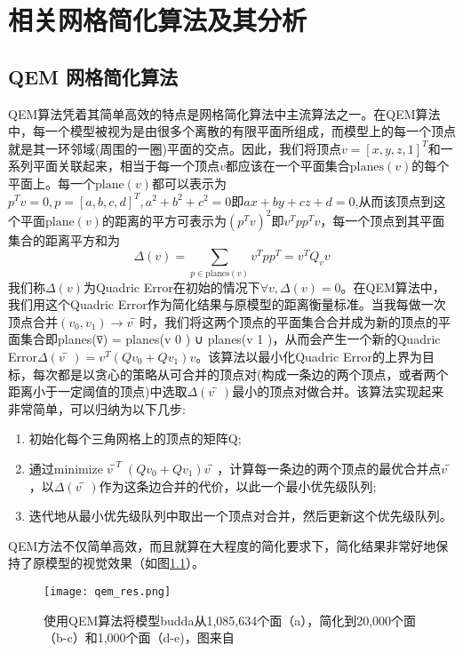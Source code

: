 
\chapter{相关网格简化算法及其分析}
\section{QEM 网格简化算法}
QEM算法凭着其简单高效的特点是网格简化算法中主流算法之一。在QEM算法中，每一个模型被视为是由很多个离散的有限平面所组成，而模型上的每一个顶点就是其一环邻域(周围的一圈)平面的交点。因此，我们将顶点$v=[x,y,z,1]^T$和一系列平面关联起来，相当于每一个顶点$v$都应该在一个平面集合$\text{planes}(v)$的每个平面上。每一个$\text{plane}(v)$都可以表示为$p^Tv=0,p=[a,b,c,d]^T,a^2+b^2+c^2=0即ax+by+cz+d=0$,从而该顶点到这个平面$\text{plane}(v)$的距离的平方可表示为$(p^Tv)^2$即$v^Tpp^Tv$，每一个顶点到其平面集合的距离平方和为
\begin{equation}
  \Delta(v) = \sum_{p\in \text{planes}(v)}v^Tpp^T = v^TQ_vv
\end{equation}
我们称$\Delta(v)$为Quadric Error在初始的情况下$\forall v,\Delta(v)=0$。在QEM算法中，我们用这个Quadric
Error作为简化结果与原模型的距离衡量标准。当我每做一次顶点合并$(v_0, v_1) \to v̅$时，我们将这两个顶点的平面集合合并成为新的顶点的平面集合即planes(v̅) = planes(v 0 ) ∪ planes(v 1 )，从而会产生一个新的Quadric Error$\Delta(v̅)=v^T(Qv_0+Qv_1)v$。该算法以最小化Quadric Error的上界为目标，每次都是以贪心的策略从可合并的顶点对(构成一条边的两个顶点，或者两个距离小于一定阈值的顶点)中选取$\Delta(v̅)$最小的顶点对做合并。该算法实现起来非常简单，可以归纳为以下几步:
\begin{enumerate}
  \item 初始化每个三角网格上的顶点的矩阵Q;
  \item 通过$\text{minimize} \; v̅^T(Qv_0+Qv_1)v̅$，计算每一条边的两个顶点的最优合并点$v̅$ ，以$\Delta(v̅)$作为这条边合并的代价，以此一个最小优先级队列;
  \item 迭代地从最小优先级队列中取出一个顶点对合并，然后更新这个优先级队列。
\end{enumerate}
QEM方法不仅简单高效，而且就算在大程度的简化要求下，简化结果非常好地保持了原模型的视觉效果（如图\ref{fig:qem-res}）。
\begin{figure}[htbp]
    \centering
    \texttt{[image: qem\_res.png]}
    \caption{使用QEM算法将模型budda从1,085,634个面（a），简化到20,000个面（b-c）和1,000个面（d-e)，图来自\cite{qem2}}
    \label{fig:qem-res}
\end{figure}

